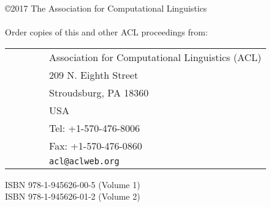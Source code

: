 \documentclass[11pt]{article}
\begin{document}
%


\vspace*{3.5in}
\large
\noindent
\copyright 2017 The Association for Computational Linguistics\\
\hspace*{6.5mm} \\

\vspace*{0.6in}
\noindent Order copies of this and other ACL proceedings from: \\
\vspace*{3mm}

\begin{tabular}{ll}
\ \ \ \ \ \ & Association for Computational Linguistics (ACL)\\
& 209 N. Eighth Street\\
& Stroudsburg, PA 18360\\
& USA\\
& Tel: +1-570-476-8006\\
& Fax: +1-570-476-0860\\
&{\tt acl@aclweb.org}\\
\end{tabular}

\vspace*{6mm}
\noindent ISBN 978-1-945626-00-5 (Volume 1)\\
\noindent ISBN 978-1-945626-01-2 (Volume 2)\\
\end{document}

